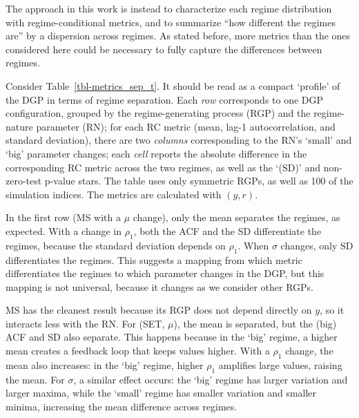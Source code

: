 \documentclass[
  letterpaper,
  DIV=11,
  numbers=noendperiod]{scrartcl}
\numberwithin{equation}{section}
\numberwithin{table}{section}
\numberwithin{figure}{section}
\begin{document}
The approach in this work is instead to characterize each regime
distribution with regime-conditional metrics, and to summarize ``how
different the regimes are'' by a dispersion across regimes. As stated
before, more metrics than the ones considered here could be necessary to
fully capture the differences between regimes.

Consider Table~\ref{tbl-metrics_sep_t}. It should be read as a compact
`profile' of the DGP in terms of regime separation. Each \emph{row}
corresponds to one DGP configuration, grouped by the regime-generating
process (RGP) and the regime-nature parameter (RN); for each RC metric
(mean, lag-1 autocorrelation, and standard deviation), there are two
\emph{columns} corresponding to the RN's `small' and `big' parameter
changes; each \emph{cell} reports the absolute difference in the
corresponding RC metric across the two regimes, as well as the `(SD)'
and non-zero-test p-value stars. The table uses only symmetric RGPs, as
well as 100 of the simulation indices. The metrics are calculated with
\((y, r)\).

\begin{table}[!htbp]

\caption{\label{tbl-metrics_sep_t}Regimes' metrics separation across
DGPs}

\centering{



}

\end{table}%

In the first row (MS with a \(\mu\) change), only the mean separates the
regimes, as expected. With a change in \(\rho_1\), both the ACF and the
SD differentiate the regimes, because the standard deviation depends on
\(\rho_1\). When \(\sigma\) changes, only SD differentiates the regimes.
This suggests a mapping from which metric differentiates the regimes to
which parameter changes in the DGP, but this mapping is not universal,
because it changes as we consider other RGPs.

MS has the cleanest result because its RGP does not depend directly on
\(y\), so it interacts less with the RN. For (SET, \(\mu\)), the mean is
separated, but the (big) ACF and SD also separate. This happens because
in the `big' regime, a higher mean creates a feedback loop that keeps
values higher. With a \(\rho_1\) change, the mean also increases: in the
`big' regime, higher \(\rho_1\) amplifies large values, raising the
mean. For \(\sigma\), a similar effect occurs: the `big' regime has
larger variation and larger maxima, while the `small' regime has smaller
variation and smaller minima, increasing the mean difference across
regimes.
\end{document}
